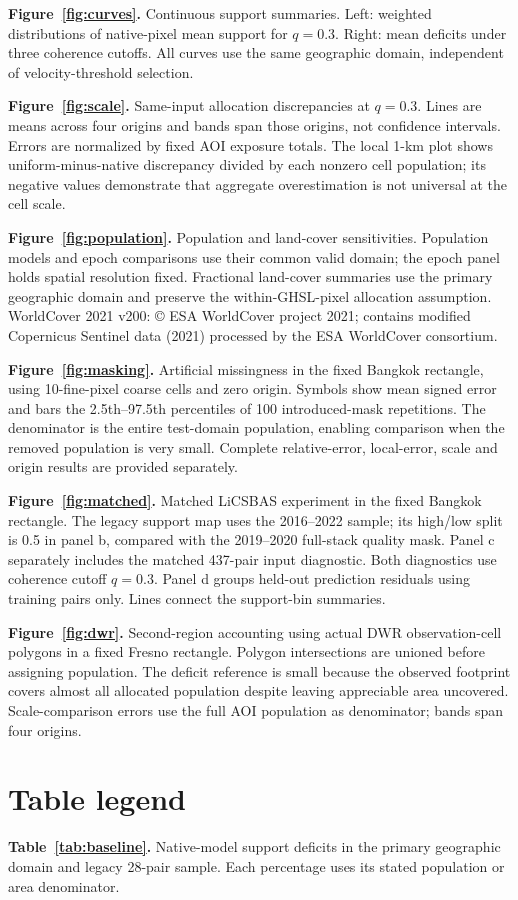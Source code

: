 \documentclass[pdflatex,sn-nature]{sn-jnl}
\begin{document}
\noindent\textbf{Figure~\ref{fig:curves}.} Continuous support summaries. Left: weighted distributions of native-pixel mean support for $q=0.3$. Right: mean deficits under three coherence cutoffs. All curves use the same geographic domain, independent of velocity-threshold selection.

\noindent\textbf{Figure~\ref{fig:scale}.} Same-input allocation discrepancies at $q=0.3$. Lines are means across four origins and bands span those origins, not confidence intervals. Errors are normalized by fixed AOI exposure totals. The local 1-km plot shows uniform-minus-native discrepancy divided by each nonzero cell population; its negative values demonstrate that aggregate overestimation is not universal at the cell scale.

\noindent\textbf{Figure~\ref{fig:population}.} Population and land-cover sensitivities. Population models and epoch comparisons use their common valid domain; the epoch panel holds spatial resolution fixed. Fractional land-cover summaries use the primary geographic domain and preserve the within-GHSL-pixel allocation assumption. WorldCover 2021 v200: \copyright{} ESA WorldCover project 2021; contains modified Copernicus Sentinel data (2021) processed by the ESA WorldCover consortium.

\noindent\textbf{Figure~\ref{fig:masking}.} Artificial missingness in the fixed Bangkok rectangle, using 10-fine-pixel coarse cells and zero origin. Symbols show mean signed error and bars the 2.5th--97.5th percentiles of 100 introduced-mask repetitions. The denominator is the entire test-domain population, enabling comparison when the removed population is very small. Complete relative-error, local-error, scale and origin results are provided separately.

\noindent\textbf{Figure~\ref{fig:matched}.} Matched LiCSBAS experiment in the fixed Bangkok rectangle. The legacy support map uses the 2016--2022 sample; its high/low split is 0.5 in panel b, compared with the 2019--2020 full-stack quality mask. Panel c separately includes the matched 437-pair input diagnostic. Both diagnostics use coherence cutoff $q=0.3$. Panel d groups held-out prediction residuals using training pairs only. Lines connect the support-bin summaries.

\noindent\textbf{Figure~\ref{fig:dwr}.} Second-region accounting using actual DWR observation-cell polygons in a fixed Fresno rectangle. Polygon intersections are unioned before assigning population. The deficit reference is small because the observed footprint covers almost all allocated population despite leaving appreciable area uncovered. Scale-comparison errors use the full AOI population as denominator; bands span four origins.

\section*{Table legend}
\noindent\textbf{Table~\ref{tab:baseline}.} Native-model support deficits in the primary geographic domain and legacy 28-pair sample. Each percentage uses its stated population or area denominator.
\end{document}
